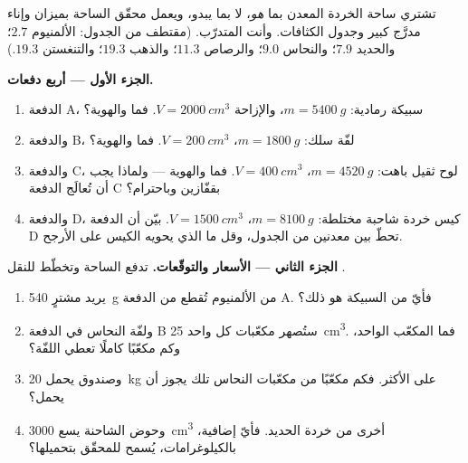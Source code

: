 \begin{problem}\label{pb:g7:volume-mass-density:1}
تشتري ساحة الخردة المعدن بما \emph{هو}، لا بما يبدو، ويعمل
محقّق الساحة بميزان وإناء مدرَّج كبير وجدول الكثافات. وأنت
المتدرّب. (مقتطف من الجدول: الألمنيوم $2.7$؛ والحديد $7.9$؛
والنحاس $9.0$؛ والرصاص $11.3$؛ والذهب $19.3$؛ والتنغستن
$19.3$.)

\medskip\noindent\textbf{الجزء الأول --- أربع دفعات.}
\begin{enumerate}
  \item الدفعة A، سبيكة رمادية: $m = \qty{5400}{g}$،
        والإزاحة $V = \qty{2000}{cm^3}$. فما  والهوية؟
  \item والدفعة B، لفّة سلك: $m = \qty{1800}{g}$،
        $V = \qty{200}{cm^3}$. فما  والهوية؟
  \item والدفعة C، لوح ثقيل باهت: $m = \qty{4520}{g}$،
        $V = \qty{400}{cm^3}$. فما  والهوية --- ولماذا
        يجب أن تُعالَج الدفعة C بقفّازين وباحترام؟
  \item والدفعة D، كيس خردة شاحبة مختلطة: $m = \qty{8100}{g}$،
        $V = \qty{1500}{cm^3}$. بيّن أن  الدفعة D تحطّ بين
        معدنين من الجدول، وقل ما الذي يحويه الكيس على
        الأرجح.
\end{enumerate}

\medskip\noindent\textbf{الجزء الثاني --- الأسعار
والتوقّعات.}
تدفع الساحة  وتخطّط للنقل .
\begin{enumerate}[resume]
  \item يريد مشترٍ \qty{540}{g} من الألمنيوم تُقطع من الدفعة
        A. فأيّ  من السبيكة هو ذلك؟
  \item ولفّة النحاس في الدفعة B ستُصهر مكعّبات  كل واحد
        \qty{25}{cm^3}. فما  المكعّب الواحد، وكم مكعّبًا
        كاملًا تعطي اللفّة؟
  \item وصندوق يحمل \qty{20}{kg} على الأكثر. فكم مكعّبًا من
        مكعّبات النحاس تلك يجوز أن يحمل؟
  \item وحوض الشاحنة يسع \qty{3000}{cm^3} أخرى من خردة الحديد.
        فأيّ  إضافية، بالكيلوغرامات، يُسمح للمحقّق
        بتحميلها؟
\end{enumerate}


\end{problem}
